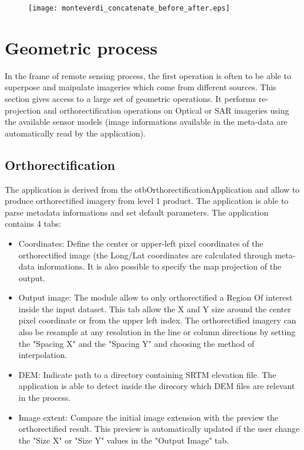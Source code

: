\documentclass{InsightSoftwareGuide}
\begin{document}
\begin{figure}
   \center
   \texttt{[image: monteverdi\_concatenate\_before\_after.eps]}
   \label{fig:concatenate}
\end{figure}
 
\section{Geometric process}
In the frame of remote sensing process, the first operation is often to be able to superpose and maipulate imageries which 
come from different sources.
This section gives access to a large set of geometric operations.
It performs re-projection and orthorectification operations on Optical or SAR imageries using the available sensor models 
(image informations available in the meta-data are automatically read by the application).  
\subsection{Orthorectification}
The application is derived from the otbOrthorectificationApplication and allow to produce orthorectified imagery from level 1 
product.
The application is able to parse metadata informations and set default parameters. The application contains 4 tabs:

\begin{itemize}
\item Coordinates: Define the center or upper-left pixel coordinates of the orthorectified image (the Long/Lat coordinates are 
calculated through meta-data informations. It is also possible to specify the map projection of the output.
\item Output image: The module allow to only orthorectified a Region Of interest inside the input dataset. This tab allow the X and Y size 
around the center pixel coordinate or from the upper left index. The orthorectified imagery can also be resample at any resolution in the
line or column directions by setting the "Spacing X" and the "Spacing Y" and choosing the method of interpolation.
\item DEM: Indicate path to a directory containing SRTM elevation file. The application is able to detect inside the direcory which 
DEM files are relevant in the process.
\item Image extent: Compare the initial image extension with the preview the orthorectified result. This preview is automatically 
updated if the user change the "Size X" or "Size Y" values in the "Output Image" tab.   
\end{itemize}
\end{document}
